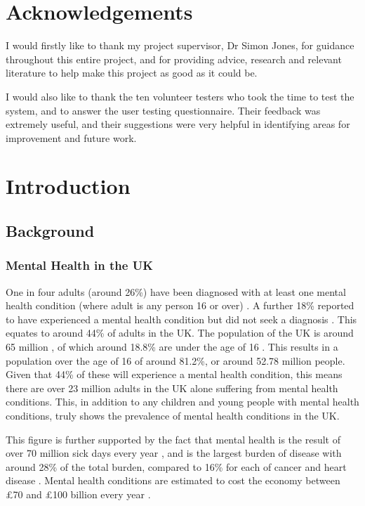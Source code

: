 \documentclass[11pt,openright,a4paper]{report}
\begin{document}
\tableofcontents
\newpage
\listoffigures
\newpage
\listoftables
\newpage


\chapter*{Acknowledgements}
I would firstly like to thank my project supervisor, Dr Simon Jones, for guidance throughout this entire project, and for providing advice, research and relevant literature to help make this project as good as it could be.

I would also like to thank the ten volunteer testers who took the time to test the system, and to answer the user testing questionnaire. Their feedback was extremely useful, and their suggestions were very helpful in identifying areas for improvement and future work.

\newpage
\setcounter{page}{1}

\chapter{Introduction}
\section{Background}
\subsection{Mental Health in the UK}
One in four adults (around 26\%) have been diagnosed with at least one mental health condition (where adult is any person 16 or over) \parencite{hse2014}. A further 18\% reported to have experienced a mental health condition but did not seek a diagnosis \parencite{hse2014}. This equates to around 44\% of adults in the UK. The population of the UK is around 65 million \parencite{onspopulation}, of which around 18.8\% are under the age of 16 \parencite{onspopulation}. This results in a population over the age of 16 of around 81.2\%, or around 52.78 million people. Given that 44\% of these will experience a mental health condition, this means there are over 23 million adults in the UK alone suffering from mental health conditions. This, in addition to any children and young people with mental health conditions, truly shows the prevalence of mental health conditions in the UK.

This figure is further supported by the fact that mental health is the result of over 70 million sick days every year \parencite{cmoreport2013}, and is the largest burden of disease with around 28\% of the total burden, compared to 16\% for each of cancer and heart disease \parencite{burdendisorders}. Mental health conditions are estimated to cost the economy between \pounds 70 and \pounds 100 billion every year \parencite{cmoreport2013}.
\end{document}
